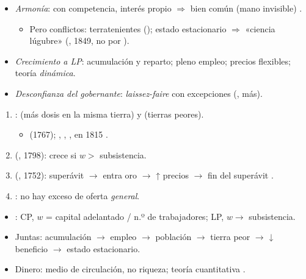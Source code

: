 \documentclass{article}
\begin{document}
\begin{columnas}
\begin{itemize}
\item \emph{Armonía}: con competencia, interés propio $\Rightarrow$ bien común (mano invisible) .
  \begin{itemize}
  \item Pero conflictos: terratenientes (); estado estacionario $\Rightarrow$ «ciencia lúgubre» (, 1849, no por ).
  \end{itemize}
\item \emph{Crecimiento a LP}: acumulación y reparto; pleno empleo; precios flexibles; teoría \emph{dinámica}.
\item \emph{Desconfianza del gobernante}: \emph{laissez-faire} con excepciones (, más).
\end{itemize}
\begin{enumerate}
\item {}:  (más dosis en la misma tierra) y  (tierras peores).
  \begin{itemize}
  \item {} (1767); , , ,  en 1815 .
  \end{itemize}
\item {} (, 1798): crece si $w>$ subsistencia.
\item {} (, 1752): superávit $\to$ entra oro $\to$ ↑ precios $\to$ fin del superávit .
\item {}: no hay exceso de oferta \emph{general}.
\end{enumerate}
\begin{itemize}
\item {}: CP, $w$ = capital adelantado / n.º de trabajadores; LP, $w\to$ subsistencia.
\item Juntas: acumulación $\to$ empleo $\to$ población $\to$ tierra peor $\to$ ↓ beneficio $\to$ estado estacionario.
\end{itemize}
\begin{itemize}
\item Dinero: medio de circulación, no riqueza; teoría cuantitativa .

\end{itemize}
\end{columnas}
\end{document}
